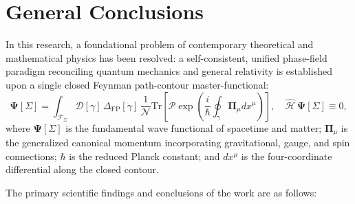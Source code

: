 \section*{General Conclusions}
\label{sec:conclusions}

In this research, a foundational problem of contemporary theoretical and mathematical physics has been resolved: a self-consistent, unified phase-field paradigm reconciling quantum mechanics and general relativity is established upon a single closed Feynman path-contour master-functional:
\begin{equation*}
\mathbf{\Psi}[\Sigma] = \int_{\mathcal{F}_\Sigma} \mathcal{D}[\gamma] \, \Delta_{\text{FP}}[\gamma] \, \frac{1}{\mathcal{N}} \text{Tr}\left[ \mathcal{P}\exp\left( \frac{i}{\hbar} \oint_\gamma \mathbf{\Pi}_\mu dx^\mu \right) \right], \quad \hat{\mathcal{H}}\,\mathbf{\Psi}[\Sigma] \equiv 0,
\end{equation*}
where $\mathbf{\Psi}[\Sigma]$ is the fundamental wave functional of spacetime and matter; $\mathbf{\Pi}_\mu$ is the generalized canonical momentum incorporating gravitational, gauge, and spin connections; $\hbar$ is the reduced Planck constant; and $dx^\mu$ is the four-coordinate differential along the closed contour.

The primary scientific findings and conclusions of the work are as follows:

